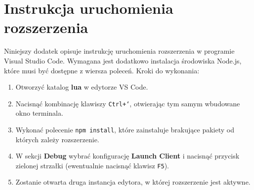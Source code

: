 \chapter{Instrukcja uruchomienia rozszerzenia}
Niniejszy dodatek opisuje instrukcję uruchomienia rozszerzenia w programie Visual Studio Code. Wymagana jest dodatkowo instalacja środowiska Node.js, które musi być dostępne z wiersza poleceń. Kroki do wykonania:

\begin{enumerate}
    \item Otworzyć katalog \textbf{lua} w edytorze VS Code.
    \item Nacisnąć kombinację klawiszy \texttt{Ctrl+`}, otwierając tym samym wbudowane okno terminala.
    \item Wykonać polecenie \texttt{npm install}, które zainstaluje brakujące pakiety od których zależy rozszerzenie.
    \item W sekcji \textbf{Debug} wybrać konfigurację \textbf{Launch Client} i nacisnąć przycisk zielonej strzałki (ewentualnie nacisnąć klawisz \texttt{F5}).
    \item Zostanie otwarta druga instancja edytora, w której rozszerzenie jest aktywne.
\end{enumerate}